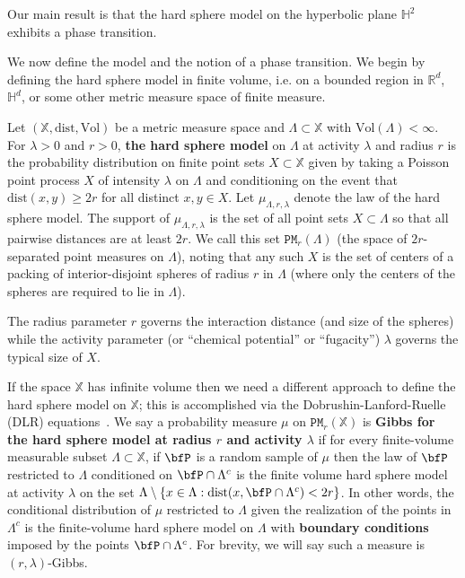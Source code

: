 \documentclass[11pt]{amsart}
\theoremstyle{definition}
\theoremstyle{remark}
\renewcommand{\H}{\mathbb{H}}
\newcommand{\R}{\mathbb{R}}
\newcommand{\bX}{\mathbb{X}}
\newcommand{\cP}{\mathtt{PM}}
\newcommand{\lam}{\lambda}
\newcommand{\Lam}{\Lambda}
\newcommand{\mes}{\mathrm{Vol}}
\newcommand{\dist}{\mathrm{dist}}
\begin{document}
Our main result is that the hard sphere model on the hyperbolic plane $\H^2$  exhibits a phase transition.  

We now define the model and the notion of a phase transition.  We begin by defining the hard sphere model in finite volume, i.e. on a bounded region in $\R^d$, $\H^d$, or  some other metric measure space of finite measure. 






Let $(\bX, \dist, \mes)$ be a metric measure space and $\Lambda \subset \bX$ with $\mes(\Lambda)<\infty$. For $\lam > 0$ and $r > 0$, \textbf{the hard sphere model} on $\Lambda$ at activity $\lam$ and radius $r$ is the probability distribution on  finite point sets $X \subset \bX$ given by taking a Poisson point process $X$ of intensity $\lam$ on $\Lam$ and conditioning on the event that $\dist(x,y)\ge 2r$ for all distinct $x, y \in X$.  Let $\mu_{\Lambda, r,\lam}$ denote the law of the hard sphere model.  The support of $\mu_{\Lambda, r,\lam}$ is the set of all  point sets $X\subset \Lambda$ so that all pairwise distances are at least $2r$. We call this set $\cP_r(\Lambda)$ (the space of $2r$-separated point measures on $\Lambda$), noting that any such $X$ is the set of centers of a packing of interior-disjoint spheres of radius $r$ in $\Lambda$ (where only the centers of the spheres are  required to lie  in $\Lambda$). 


The radius parameter $r$ governs the interaction distance (and size of the spheres) while the activity parameter (or ``chemical potential'' or ``fugacity'') $\lam$ governs the typical size of $X$.





If the space $\bX$ has infinite volume then we need a different approach to define the hard sphere model on $\bX$; this is accomplished via the Dobrushin-Lanford-Ruelle (DLR) equations~\cite{dobruschin1968description,lanford1969observables}.   We say a probability measure $\mu$ on $\cP_r(\bX)$ is {\bf Gibbs for the hard sphere model at radius $r$ and activity $\lambda$} if for every finite-volume measurable subset $\Lambda \subset \bX$, if $\bfP$ is a random sample of $\mu$ then the law of $\bfP$ restricted to $\Lambda$ conditioned on $\bfP \cap \Lambda^c$ is the finite volume  hard sphere model at activity $\lam$ on the set $\Lambda \setminus \{ x \in \Lambda: \dist (x, \bfP \cap \Lambda^c) <2r\}$.  In other words, the conditional distribution of $\mu$ restricted to $\Lambda$ given the realization of the points in $\Lambda^c$ is the finite-volume hard sphere model on $\Lambda$ with {\bf boundary conditions} imposed by the points  $\bfP \cap \Lambda^c$.   For brevity, we will say such a measure is $(r,\lambda)$-Gibbs.
\end{document}
